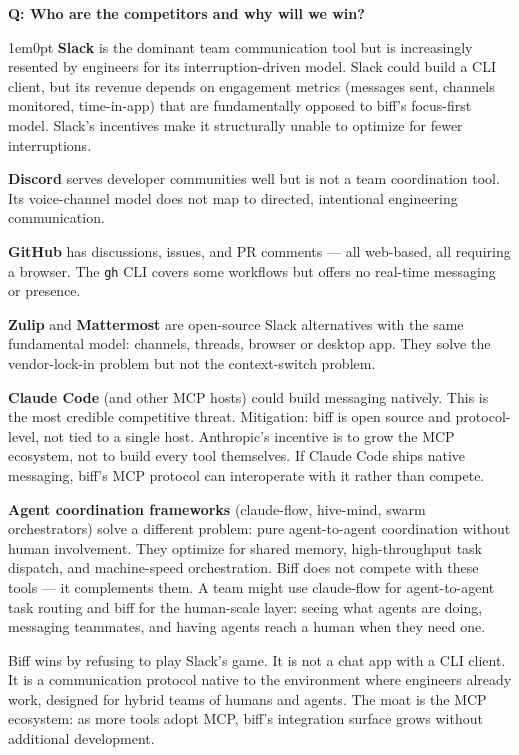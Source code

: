 \documentclass[11pt,letterpaper]{article}
\newcounter{faqnum}
\newenvironment{faqpair}[1]{%
  \needspace{4\baselineskip}%
  \vspace{0.5em}%
  \refstepcounter{faqnum}%
  \noindent\textbf{\color{SectionBlue}Q\thefaqnum: #1}\par\nopagebreak[4]%
  \vspace{0.2em}%
  \begin{adjustwidth}{1em}{0pt}%
  \setlength{\parindent}{0pt}%
}{%
  \end{adjustwidth}%
  \vspace{0.5em}%
}
\begin{document}
\begin{faqpair}{Who are the competitors and why will we win?}\label{faq:competitors}
  \textbf{Slack} is the dominant team communication tool but is
  increasingly resented by engineers for its interruption-driven model.
  Slack could build a CLI client, but its revenue depends on engagement
  metrics (messages sent, channels monitored, time-in-app) that are
  fundamentally opposed to biff's focus-first model. Slack's incentives
  make it structurally unable to optimize for fewer interruptions.

  \textbf{Discord} serves developer communities well but is not a team
  coordination tool. Its voice-channel model does not map to directed,
  intentional engineering communication.

  \textbf{GitHub} has discussions, issues, and PR comments --- all
  web-based, all requiring a browser. The \texttt{gh} CLI covers some
  workflows but offers no real-time messaging or presence.

  \textbf{Zulip} and \textbf{Mattermost} are open-source Slack
  alternatives with the same fundamental model: channels, threads, browser
  or desktop app. They solve the vendor-lock-in problem but not the
  context-switch problem.

  \textbf{Claude Code} (and other MCP hosts) could build messaging
  natively. This is the most credible competitive threat. Mitigation:
  biff is open source and protocol-level, not tied to a single host.
  Anthropic's incentive is to grow the MCP ecosystem, not to build every
  tool themselves. If Claude Code ships native messaging, biff's MCP
  protocol can interoperate with it rather than compete.

  \textbf{Agent coordination frameworks} (claude-flow, hive-mind, swarm
  orchestrators) solve a different problem: pure agent-to-agent
  coordination without human involvement. They optimize for shared memory,
  high-throughput task dispatch, and machine-speed orchestration. Biff does
  not compete with these tools --- it complements them. A team might use
  claude-flow for agent-to-agent task routing and biff for the human-scale
  layer: seeing what agents are doing, messaging teammates, and having
  agents reach a human when they need one.

  Biff wins by refusing to play Slack's game. It is not a chat app with a
  CLI client. It is a communication protocol native to the environment
  where engineers already work, designed for hybrid teams of humans and
  agents. The moat is the MCP ecosystem: as more tools adopt MCP, biff's
  integration surface grows without additional development.
\end{faqpair}
\end{document}
